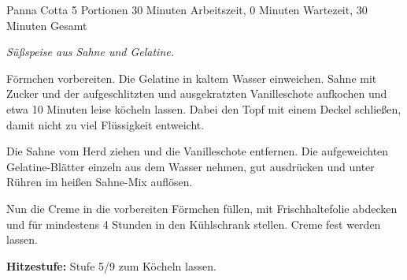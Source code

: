 \begin{recipe}{Panna Cotta} {5 Portionen} {30 Minuten Arbeitszeit, 0 Minuten Wartezeit, 30 Minuten Gesamt}

  \freeform{}\textit{Süßspeise aus Sahne und Gelatine.}


  Förmchen vorbereiten.
  Die Gelatine in kaltem Wasser einweichen.
  Sahne mit Zucker und der aufgeschlitzten und ausgekratzten Vanilleschote aufkochen und etwa 10 Minuten leise köcheln lassen.
  Dabei den Topf mit einem Deckel schließen, damit nicht zu viel Flüssigkeit entweicht.

  \newstep{}Die Sahne vom Herd ziehen und die Vanilleschote entfernen.
  Die aufgeweichten Gelatine-Blätter einzeln aus dem Wasser nehmen, gut ausdrücken und unter Rühren im heißen Sahne-Mix auflösen.

  \newstep{}Nun die Creme in die vorbereiten Förmchen füllen, mit Frischhaltefolie abdecken und für mindestens 4 Stunden in den Kühlschrank stellen.
  Creme fest werden lassen.

  \freeform{}\hrulefill{}

  \freeform{}\textbf{Hitzestufe:}
  Stufe 5/9 zum Köcheln lassen.

\end{recipe}

